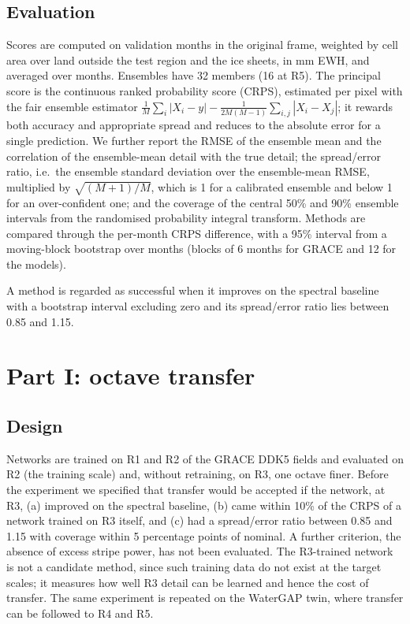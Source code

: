 \documentclass[11pt,a4paper]{article}
\begin{document}
\subsection{Evaluation}
Scores are computed on validation months in the original frame, weighted by cell area over
land outside the test region and the ice sheets, in mm EWH, and averaged over months.
Ensembles have 32 members (16 at R5).
The principal score is the continuous ranked probability score (CRPS), estimated per pixel with
the fair ensemble estimator
$\frac1M\sum_i|X_i - y| - \frac{1}{2M(M-1)}\sum_{i,j}|X_i - X_j|$; it rewards both accuracy and
appropriate spread and reduces to the absolute error for a single prediction. We further report
the RMSE of the ensemble mean and the correlation of the ensemble-mean detail with the true
detail; the spread/error ratio, i.e.\ the ensemble standard deviation over the ensemble-mean
RMSE, multiplied by $\sqrt{(M+1)/M}$, which is 1 for a calibrated ensemble and below 1 for an
over-confident one; and the coverage of the central 50\% and 90\% ensemble intervals from the
randomised probability integral transform. Methods are compared through the per-month CRPS
difference, with a 95\% interval from a moving-block bootstrap over months (blocks of 6 months
for GRACE and 12 for the models).

A method is regarded as successful when it improves on the spectral baseline with a bootstrap
interval excluding zero and its spread/error ratio lies between 0.85 and 1.15.

\section{Part I: octave transfer}\label{sec:part1}

\subsection{Design}
Networks are trained on R1 and R2 of the GRACE DDK5 fields and evaluated on R2 (the training
scale) and, without retraining, on R3, one octave finer. Before the experiment we specified
that transfer would be accepted if the network, at R3, (a) improved on the spectral baseline,
(b) came within 10\% of the CRPS of a network trained on R3 itself, and (c) had a spread/error
ratio between 0.85 and 1.15 with coverage within 5 percentage points of nominal. A further
criterion, the absence of excess stripe power, has not been evaluated. The
R3-trained network is not a candidate method, since such training data do not exist at the
target scales; it measures how well R3 detail can be learned and hence the cost of transfer.
The same experiment is repeated on the WaterGAP twin, where transfer can be followed to R4 and
R5.
\end{document}
